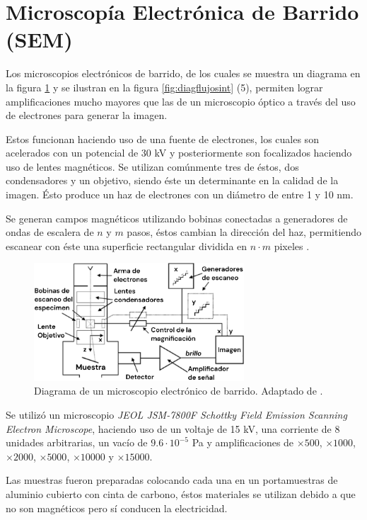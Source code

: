 \documentclass[../main.tex]{subfiles}
\begin{document}
\section{Microscopía Electrónica de Barrido (SEM)} \label{sec:metodologiaSEM}
Los microscopios electrónicos de barrido, de los cuales se muestra un diagrama en la figura \ref{fig:semdiag} y se ilustran en la figura \ref{fig:diagflujosint} (5), permiten lograr amplificaciones mucho mayores que las de un microscopio óptico a través del uso de electrones para generar la imagen.

Estos funcionan haciendo uso de una fuente de electrones, los cuales son acelerados con un potencial de 30 kV y posteriormente son focalizados haciendo uso de lentes magnéticos. Se utilizan comúnmente tres de éstos, dos condensadores y un objetivo, siendo éste un determinante en la calidad de la imagen. Ésto produce un haz de electrones con un diámetro de entre 1 y 10 nm.

Se generan campos magnéticos utilizando bobinas conectadas a generadores de ondas de escalera de $n$ y $m$ pasos, éstos cambian la dirección del haz, permitiendo escanear con éste una superficie rectangular dividida en $n\cdot m$ pixeles \cite{Egerton2005}.
\begin{figure}[H]
    \centering
    \includegraphics[width=0.7\textwidth]{fig/semdiag.png}
    \caption{Diagrama de un microscopio electrónico	de barrido. Adaptado de \cite{Egerton2005}.}
    \label{fig:semdiag}
\end{figure}
Se utilizó un microscopio \textit{JEOL JSM-7800F Schottky Field Emission Scanning Electron Microscope}, haciendo uso de un voltaje de 15 kV, una corriente de 8 unidades arbitrarias, un vacío de $9.6\cdot10^{-5}$ Pa y amplificaciones de $\times500$, $\times1000$, $\times2000$, $\times5000$, $\times10000$ y $\times15000$.

Las muestras fueron preparadas colocando cada una en un portamuestras de aluminio cubierto con cinta de carbono, éstos materiales se utilizan debido a que no son magnéticos pero sí conducen la electricidad.
\end{document}
